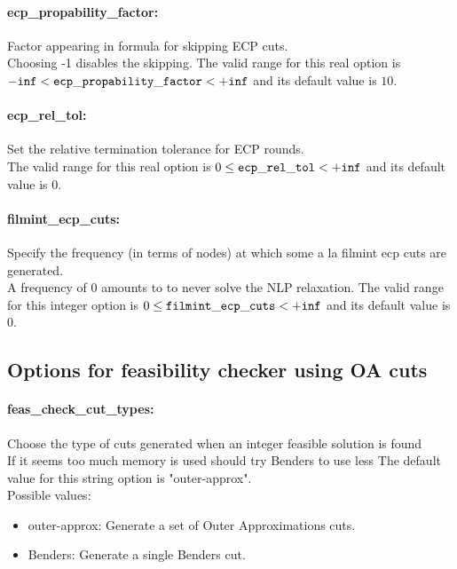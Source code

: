 \paragraph{ecp\_propability\_factor:}\label{sec:ecp_propability_factor} Factor appearing in formula for skipping ECP cuts. $\;$ \\
 Choosing -1 disables the skipping. The valid range for this real option is 
${\tt -inf} <  {\tt ecp\_propability\_factor } <  {\tt +inf}$
and its default value is $10$.


\paragraph{ecp\_rel\_tol:}\label{sec:ecp_rel_tol} Set the relative termination tolerance for ECP rounds. $\;$ \\
 The valid range for this real option is 
$0 \le {\tt ecp\_rel\_tol } <  {\tt +inf}$
and its default value is $0$.


\paragraph{filmint\_ecp\_cuts:}\label{sec:filmint_ecp_cuts} Specify the frequency (in terms of nodes) at which some a la filmint ecp cuts are generated. $\;$ \\
 A frequency of 0 amounts to to never solve the
NLP relaxation. The valid range for this integer option is
$0 \le {\tt filmint\_ecp\_cuts } <  {\tt +inf}$
and its default value is $0$.


\subsection{Options for feasibility checker using OA cuts}
\label{sec:Options_for_feasibility_checker_using_OA_cuts}
\paragraph{feas\_check\_cut\_types:}\label{sec:feas_check_cut_types} Choose the type of cuts generated when an integer feasible solution is found $\;$ \\
 If it seems too much memory is used should try
Benders to use less
The default value for this string option is "outer-approx".
\\ 
Possible values:
\begin{itemize}
   \item outer-approx: Generate a set of Outer Approximations cuts.
   \item Benders: Generate a single Benders cut.
\end{itemize}

